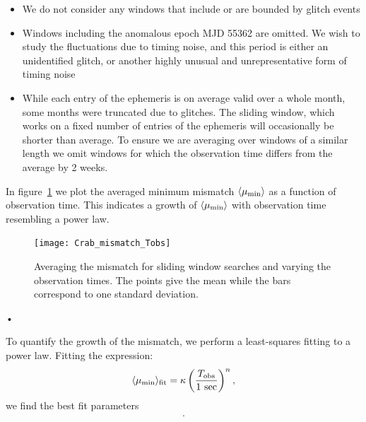 \documentclass[../full_thesis/full_thesis.tex]{subfiles}
\newcommand{\thisdir}{../timing_noise_in_CGW}
\begin{document}
\begin{itemize}
    \item We do not consider any windows that
    include or are bounded by glitch events

    \item Windows including the anomalous epoch MJD 55362 are omitted. We 
    wish to study the fluctuations due to timing noise, and this
    period is either an unidentified glitch, or another highly unusual and
    unrepresentative form of timing noise
        
   \item While each entry of the ephemeris is on average valid over a whole
   month, some months were truncated due to glitches. The sliding window, which
   works on a fixed number of entries of the ephemeris will occasionally be
   shorter than average. To ensure we are averaging over windows of a
   similar length we omit windows for which the observation time differs from
   the average by 2 weeks.
   
\end{itemize}

In figure~\ref{fig: mismatch Tobs} we plot the averaged minimum
mismatch $\langle\mu_{\mathrm{min}}\rangle$ as a function of observation time.
This indicates a growth of $\langle\mu_{\mathrm{min}}\rangle$ with observation time
resembling a power law.
\begin{figure}[ht]
\centering
\texttt{[image: Crab\_mismatch\_Tobs]}
\caption{Averaging the mismatch for sliding window searches and varying the
observation times. The points give the mean while the bars correspond to one 
standard deviation.}
\label{fig: mismatch Tobs}
\end{figure}•

To quantify the growth of the mismatch, we perform a least-squares fitting 
to a power law. Fitting the expression:
\begin{equation}
\langle\mu_{\mathrm{min}}\rangle_{\textrm{fit}} = \kappa 
                                   \left(\frac{T_{\textrm{obs}}}{1\textrm{ sec}}\right)^{n},
\end{equation}
we find the best fit parameters
\begin{align}
    .
    \label{eqn: fit values}
\end{align}
\end{document}
